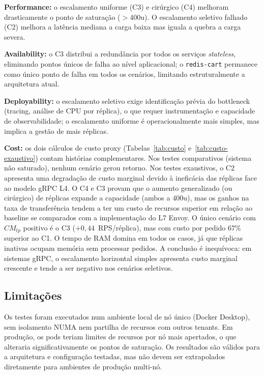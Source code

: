\documentclass[manuscript,oneside]{acmart}
\begin{document}
\textbf{Performance:} o escalamento uniforme (C3) e cirúrgico (C4) melhoram drasticamente o ponto de saturação ($>$400u). O escalamento seletivo falhado (C2) melhora a latência mediana a carga baixa mas iguala a quebra a carga severa.

\textbf{Availability:} o C3 distribui a redundância por todos os serviços \textit{stateless}, eliminando pontos únicos de falha ao nível aplicacional; o \texttt{redis-cart} permanece como único ponto de falha em todos os cenários, limitando estruturalmente a arquitetura atual.

\textbf{Deployability:} o escalamento seletivo exige identificação prévia do bottleneck (tracing, análise de CPU por réplica), o que requer instrumentação e capacidade de observabilidade; o escalamento uniforme é operacionalmente mais simples, mas implica a gestão de mais réplicas.

\textbf{Cost:} os dois cálculos de custo proxy (Tabelas~\ref{tab:custo} e~\ref{tab:custo-exaustivo}) contam histórias complementares. Nos testes comparativos (sistema não saturado), nenhum cenário gerou retorno. Nos testes exaustivos, o C2 apresenta uma degradação de custo marginal devido à ineficácia das réplicas face ao modelo gRPC L4. O C4 e C3 provam que o aumento generalizado (ou cirúrgico) de réplicas expande a capacidade (ambos a 400u), mas os ganhos na taxa de transferência tendem a ter um custo de recursos superior em relação ao baseline se comparados com a implementação do L7 Envoy. O único cenário com $CM_{tp}$ positivo é o C3 ($+0{,}44$~RPS/réplica), mas com custo por pedido 67\% superior ao C1. O tempo de RAM domina em todos os casos, já que réplicas inativas ocupam memória sem processar pedidos. A conclusão é inequívoca: em sistemas gRPC, o escalamento horizontal simples apresenta custo marginal crescente e tende a ser negativo nos cenários seletivos.

\subsection{Limitações}

Os testes foram executados num ambiente local de nó único (Docker Desktop), sem isolamento NUMA nem partilha de recursos com outros tenants. Em produção, os pods teriam limites de recursos por nó mais apertados, o que alteraria significativamente os pontos de saturação. Os resultados são válidos para a arquitetura e configuração testadas, mas não devem ser extrapolados diretamente para ambientes de produção multi-nó.
\end{document}
